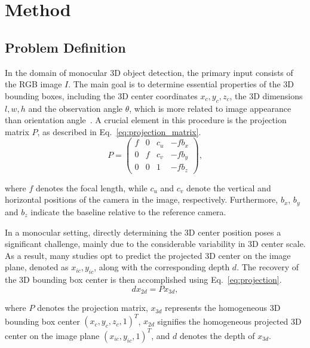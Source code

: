 \documentclass[journal]{IEEEtran}
\begin{document}
	\section{Method}\label{sec:method}
	\subsection{Problem Definition}
	In the domain of monocular 3D object detection, the primary input consists of the RGB image $I$. The main goal is to determine essential properties of the 3D bounding boxes, including the 3D center coordinates $x_c, y_c, z_c$, the 3D dimensions $l, w, h$ and the observation angle $\theta$, which is more related to image appearance than orientation angle~\cite{geometry3d}. A crucial element in this procedure is the projection matrix $P$, as described in Eq.~\eqref{eq:projection_matrix}.
	\begin{equation}
		P=\begin{pmatrix}f&0&c_u&-fb_x\\0&f&c_v&-fb_y\\0&0&1&-fb_z\end{pmatrix}
		\label{eq:projection_matrix}, 
	\end{equation}
	
	where $f$ denotes the focal length, while $c_u$ and $c_v$ denote the vertical and horizontal positions of the camera in the image, respectively. Furthermore, $b_x$, $b_y$ and $b_z$ indicate the baseline relative to the reference camera. 
	
	In a monocular setting, directly determining the 3D center position poses a significant challenge, mainly due to the considerable variability in 3D center scale. As a result, many studies opt to predict the projected 3D center on the image plane, denoted as $x_{ic}, y_{ic}$, along with the corresponding depth $d$. The recovery of the 3D bounding box center is then accomplished using Eq.~\eqref{eq:projection}.
	\begin{equation}
		dx_{2d} = Px_{3d}
		\label{eq:projection}, 
	\end{equation}
	
	where $P$ denotes the projection matrix, $x_{3d}$ represents the homogeneous 3D bounding box center $(x_c, y_c, z_c, 1)^T$, $x_{2d}$ signifies the homogeneous projected 3D center on the image plane $(x_{ic}, y_{ic}, 1)^T$, and $d$ denotes the depth of $x_{3d}$.
	
\end{document}
